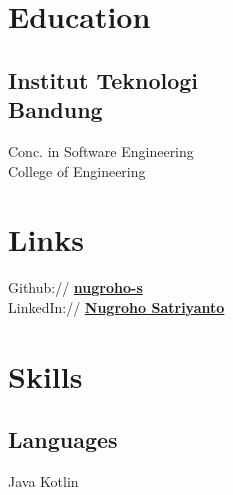 \documentclass[a4paper]{deedy-resume} %
\begin{document}
\begin{minipage}[t]{0.33\textwidth} %


\section{Education} 

\subsection{Institut Teknologi \\ Bandung}

Conc. in Software Engineering \\
College of Engineering \\

\sectionspace %


\section{Links} 

Github:// \href{https://github.com/nugroho-s}{\bf nugroho-s} \\
LinkedIn:// \href{https://www.linkedin.com/in/nugroho-satriyanto-721344112/}{\bf Nugroho Satriyanto} \\

\sectionspace %


\section{Skills}

\subsection{Languages}

Java \textbullet{} Kotlin \\


\end{minipage}
\end{document}
